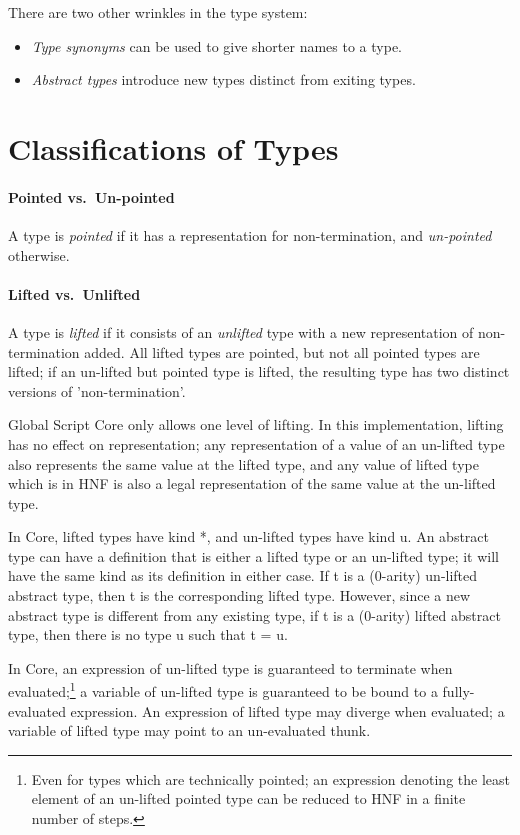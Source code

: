 \documentclass{report}
\newcommand\defn[1]{\emph{#1}}
\newcommand\lift[1]{\left\lfloor#1\right\rfloor}
\begin{document}
There are two other wrinkles in the type system:
\begin{itemize}
    \item \defn{Type synonyms} can be used to give shorter names to a type.

    \item \defn{Abstract types} introduce new types distinct from exiting types.
\end{itemize}

\section{Classifications of Types}

\paragraph{Pointed vs.~Un-pointed}
A type is \defn{pointed} if it has a representation for non-termination, and \defn{un-pointed} otherwise.

\paragraph{Lifted vs.~Unlifted}
A type is \defn{lifted} if it consists of an \defn{unlifted} type with a new representation of non-termination added.
All lifted types are pointed, but not all pointed types are lifted;
if an un-lifted but pointed type is lifted,
the resulting type has two distinct versions of 'non-termination'.

Global Script Core only allows one level of lifting.
In this implementation, lifting has no effect on representation;
any representation of a value of an un-lifted type also represents the same value at the lifted type,
and any value of lifted type which is in HNF is also a legal representation of the same value at the un-lifted type.

In Core, lifted types have kind \<*\>, and un-lifted types have kind \<u\>.
An abstract type can have a definition that is either a lifted type or an un-lifted type;
it will have the same kind as its definition in either case.
If \<t\> is a (0-arity) un-lifted abstract type, then \<\lift{t}\> is the corresponding lifted type.
However, since a new abstract type is different from any existing type,
if \<t\> is a (0-arity) lifted abstract type, then there is no type \<u\> such that \<t = \lift{u}\>.

In Core, an expression of un-lifted type is guaranteed to terminate when evaluated;\footnote{
    Even for types which are technically pointed;
    an expression denoting the least element of an un-lifted pointed type
    can be reduced to HNF in a finite number of steps.
} a variable of un-lifted type is guaranteed to be bound to a fully-evaluated expression.
An expression of lifted type may diverge when evaluated;
a variable of lifted type may point to an un-evaluated thunk.
\end{document}
